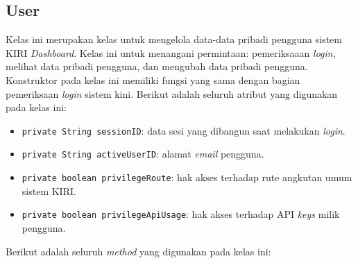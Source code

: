 \subsection{User}
\label{sec:user}
Kelas ini merupakan kelas untuk mengelola data-data pribadi pengguna sistem KIRI \textit{Dashboard}. Kelas ini untuk menangani permintaan: pemeriksaaan \textit{login}, melihat data pribadi pengguna, dan mengubah data pribadi pengguna. Konstruktor pada kelas ini memiliki fungsi yang sama dengan bagian pemeriksaan \textit{login} sistem kini. Berikut adalah seluruh atribut yang digunakan pada kelas ini:
\begin{itemize}
	\item \texttt{private String sessionID}: data sesi yang dibangun saat melakukan \textit{login}.
	\item \texttt{private String activeUserID}: alamat \textit{email} pengguna.
	\item \texttt{private boolean privilegeRoute}: hak akses terhadap rute angkutan umum sistem KIRI.
	\item \texttt{private boolean privilegeApiUsage}: hak akses terhadap API \textit{keys} milik pengguna.
\end{itemize}
Berikut adalah seluruh \textit{method} yang digunakan pada kelas ini:
